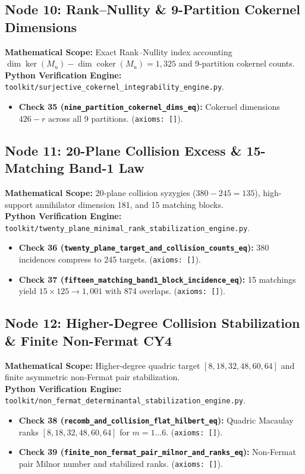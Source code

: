 \documentclass[11pt,a4paper]{article}
\DeclareMathOperator{\coker}{coker}
\begin{document}
\subsection{Node 10: Rank--Nullity \& 9-Partition Cokernel Dimensions}
\textbf{Mathematical Scope:} Exact Rank--Nullity index accounting $\dim \ker(M_u) - \dim \coker(M_u) = 1,325$ and 9-partition cokernel counts.\\
\textbf{Python Verification Engine:} \texttt{toolkit/surjective\_cokernel\_integrability\_engine.py}.
\begin{itemize}[leftmargin=1.5em]
\item \textbf{Check 35 (\texttt{nine\_partition\_cokernel\_dims\_eq}):} Cokernel dimensions $426 - r$ across all 9 partitions. (\texttt{axioms: []}).
\end{itemize}

\subsection{Node 11: 20-Plane Collision Excess \& 15-Matching Band-1 Law}
\textbf{Mathematical Scope:} 20-plane collision syzygies ($380 - 245 = 135$), high-support annihilator dimension 181, and 15 matching blocks.\\
\textbf{Python Verification Engine:} \texttt{toolkit/twenty\_plane\_minimal\_rank\_stabilization\_engine.py}.
\begin{itemize}[leftmargin=1.5em]
\item \textbf{Check 36 (\texttt{twenty\_plane\_target\_and\_collision\_counts\_eq}):} 380 incidences compress to 245 targets. (\texttt{axioms: []}).
\item \textbf{Check 37 (\texttt{fifteen\_matching\_band1\_block\_incidence\_eq}):} 15 matchings yield $15 \times 125 \to 1,001$ with 874 overlaps. (\texttt{axioms: []}).
\end{itemize}

\subsection{Node 12: Higher-Degree Collision Stabilization \& Finite Non-Fermat CY4}
\textbf{Mathematical Scope:} Higher-degree quadric target $[8,18,32,48,60,64]$ and finite asymmetric non-Fermat pair stabilization.\\
\textbf{Python Verification Engine:} \texttt{toolkit/non\_fermat\_determinantal\_stabilization\_engine.py}.
\begin{itemize}[leftmargin=1.5em]
\item \textbf{Check 38 (\texttt{recomb\_and\_collision\_flat\_hilbert\_eq}):} Quadric Macaulay ranks $[8,18,32,48,60,64]$ for $m=1\dots 6$. (\texttt{axioms: []}).
\item \textbf{Check 39 (\texttt{finite\_non\_fermat\_pair\_milnor\_and\_ranks\_eq}):} Non-Fermat pair Milnor number and stabilized ranks. (\texttt{axioms: []}).
\end{itemize}
\end{document}
